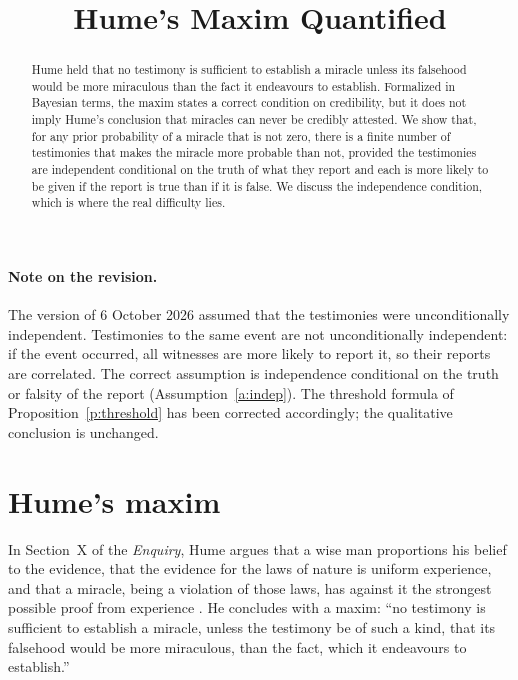 \documentclass{situationist-preprint}
\title{Hume's Maxim Quantified}
\begin{document}
\maketitle

\begin{abstract}
Hume held that no testimony is sufficient to establish a miracle unless its falsehood would be more miraculous than the fact it endeavours to establish. Formalized in Bayesian terms, the maxim states a correct condition on credibility, but it does not imply Hume's conclusion that miracles can never be credibly attested. We show that, for any prior probability of a miracle that is not zero, there is a finite number of testimonies that makes the miracle more probable than not, provided the testimonies are independent conditional on the truth of what they report and each is more likely to be given if the report is true than if it is false. We discuss the independence condition, which is where the real difficulty lies.
\end{abstract}

\paragraph{Note on the revision.} The version of 6 October 2026 assumed that the testimonies were unconditionally independent. Testimonies to the same event are not unconditionally independent: if the event occurred, all witnesses are more likely to report it, so their reports are correlated. The correct assumption is independence conditional on the truth or falsity of the report (Assumption~\ref{a:indep}). The threshold formula of Proposition~\ref{p:threshold} has been corrected accordingly; the qualitative conclusion is unchanged.

\section{Hume's maxim}

In Section~X of the \emph{Enquiry}, Hume argues that a wise man proportions his belief to the evidence, that the evidence for the laws of nature is uniform experience, and that a miracle, being a violation of those laws, has against it the strongest possible proof from experience \citep{Hume1748}. He concludes with a maxim: \enquote{no testimony is sufficient to establish a miracle, unless the testimony be of such a kind, that its falsehood would be more miraculous, than the fact, which it endeavours to establish.}
\end{document}

